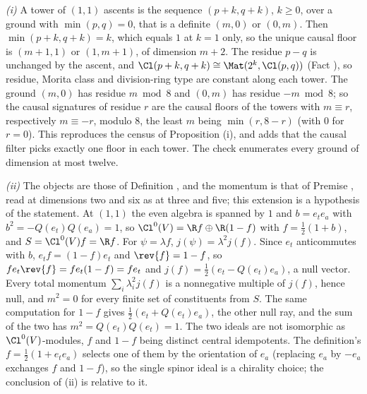 \emph{(i)} A tower of $(1,1)$ ascents is the sequence $(p+k, q+k)$, $k \geq 0$, over a ground with $\min(p,q) = 0$, that is a definite $(m,0)$ or $(0,m)$. Then $\min(p+k,q+k) = k$, which equals $1$ at $k = 1$ only, so the unique causal floor is $(m+1,1)$ or $(1,m+1)$, of dimension $m+2$. The residue $p - q$ is unchanged by the ascent, and $\Cl(p+k,q+k) \cong \Mat(2^{k}, \Cl(p,q))$ (Fact ), so residue, Morita class and division-ring type are constant along each tower. The ground $(m,0)$ has residue $m \bmod 8$ and $(0,m)$ has residue $-m \bmod 8$; so the causal signatures of residue $r$ are the causal floors of the towers with $m \equiv r$, respectively $m \equiv -r$, modulo $8$, the least $m$ being $\min(r, 8-r)$ (with $0$ for $r = 0$). This reproduces the census of Proposition (i), and adds that the causal filter picks exactly one floor in each tower. The check enumerates every ground of dimension at most twelve.

\emph{(ii)} The objects are those of Definition , and the momentum is that of Premise , read at dimensions two and six as at three and five; this extension is a hypothesis of the statement. At $(1,1)$ the even algebra is spanned by $1$ and $b = e_{t}e_{a}$ with $b^{2} = -Q(e_{t})Q(e_{a}) = 1$, so $\Cl^{0}(V) = \R f \oplus \R(1-f)$ with $f = \tfrac12(1+b)$, and $S = \Cl^{0}(V)f = \R f$. For $\psi = \lambda f$, $j(\psi) = \lambda^{2} j(f)$. Since $e_{t}$ anticommutes with $b$, $e_{t}f = (1-f)e_{t}$ and $\rev{f} = 1 - f$, so $f e_{t}\rev{f} = f e_{t}(1-f) = f e_{t}$ and $j(f) = \tfrac12(e_{t} - Q(e_{t})e_{a})$, a null vector. Every total momentum $\sum_{i}\lambda_{i}^{2} j(f)$ is a nonnegative multiple of $j(f)$, hence null, and $m^{2} = 0$ for every finite set of constituents from $S$. The same computation for $1 - f$ gives $\tfrac12(e_{t} + Q(e_{t})e_{a})$, the other null ray, and the sum of the two has $m^{2} = Q(e_{t})Q(e_{t}) = 1$. The two ideals are not isomorphic as $\Cl^{0}(V)$-modules, $f$ and $1 - f$ being distinct central idempotents. The definition's $f = \tfrac12(1 + e_{t}e_{a})$ selects one of them by the orientation of $e_{a}$ (replacing $e_{a}$ by $-e_{a}$ exchanges $f$ and $1 - f$), so the single spinor ideal is a chirality choice; the conclusion of (ii) is relative to it.


